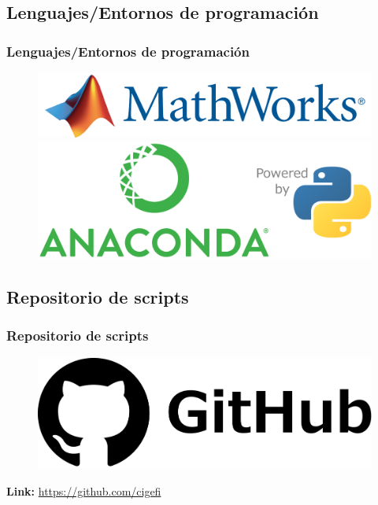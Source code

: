 \documentclass{beamer}
\newtheorem{Th1}{Reseña Historica}
\begin{document}
	\subsection{Lenguajes/Entornos de programación}
	\begin{frame}
		\frametitle{Lenguajes/Entornos de programación}
		\begin{figure}[!hbt]
		   \centering
		   \includegraphics[width=3.65 in]{mathworks.png}\\
		   \includegraphics[scale=0.4]{anaconda-python.png}
		\end{figure}
	\end{frame} 

	\subsection{Repositorio de scripts}
	\begin{frame}
		\frametitle{Repositorio de scripts}
		\begin{figure}[!hbt]
		   \centering
		   \includegraphics[width=4 in]{github.png}
		\end{figure}
		\textbf{Link: }\href{https://github.com/cigefi}{https://github.com/cigefi}
	\end{frame}
\end{document}

